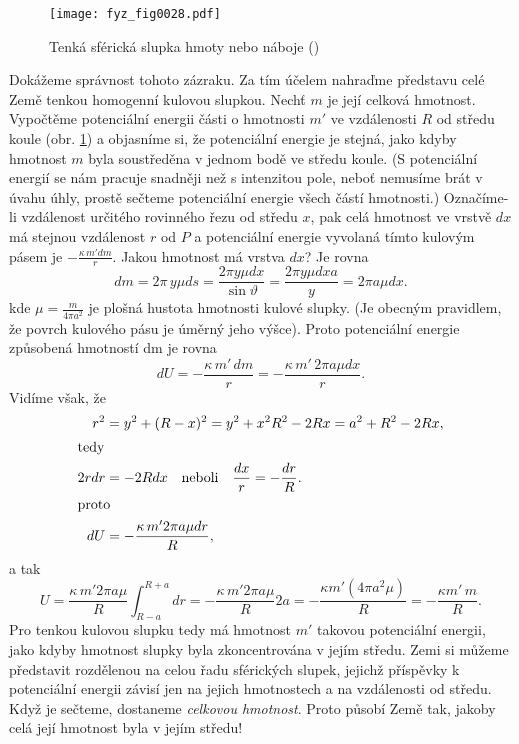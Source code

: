     \begin{figure}[ht!]  %
      \centering
      \texttt{[image: fyz\_fig0028.pdf]}
      \caption{Tenká sférická slupka hmoty nebo náboje (\cite[s.~195]{Feynman01})}
      \label{fyz:fig0028}
    \end{figure}
    Dokážeme správnost tohoto zázraku. Za tím účelem nahraďme představu celé Země tenkou homogenní 
    kulovou slupkou. Nechť \(m\) je její celková hmotnost. Vypočtěme potenciální energii části o 
    hmotnosti \(m'\) ve vzdálenosti \(R\) od středu koule (obr. \ref{fyz:fig0028}) a objasníme si, 
    že potenciální energie je stejná, jako kdyby hmotnost \(m\) byla soustředěna v jednom bodě ve 
    středu koule. (S potenciální energií se nám pracuje snadněji než s intenzitou pole, neboť 
    nemusíme brát v úvahu úhly, prostě sečteme potenciální energie všech částí hmotnosti.) 
    Označíme-li vzdálenost určitého rovinného řezu od středu \(x\), pak celá hmotnost ve vrstvě 
    \(dx\) má stejnou vzdálenost \(r\) od \(P\) a potenciální energie vyvolaná tímto kulovým pásem 
    je \(-\frac{\kappa\,m'dm}{r}\). Jakou hmotnost má vrstva \(dx\)? Je rovna
    \begin{equation}\label{fyz:eq049}
      dm = 2\pi\,y\mu ds = \frac{2\pi y\mu dx}{\sin\vartheta} 
         = \frac{2\pi y\mu dxa}{y} = 2\pi a\mu dx.
    \end{equation}
    kde \(\mu = \frac{m}{4\pi a^2}\) je plošná hustota hmotnosti kulové slupky. (Je obecným 
    pravidlem, že povrch kulového pásu je úměrný jeho výšce). Proto potenciální energie způsobená 
    hmotností dm je rovna
    \begin{equation}\label{fyz:eq050}
      dU = -\frac{\kappa\,m'\,dm}{r} = -\frac{\kappa\,m'\,2\pi a\mu dx}{r}.
    \end{equation}
    Vidíme však, že
    \begin{align*}
      r^2  &= y^2 + (R-x)^2 = y^2 + x^2 R^2 - 2Rx = a^2 + R^2 - 2Rx,           \\
      \shortintertext{tedy}
      2rdr &= -2Rdx \quad \text{neboli} \quad \frac{dx}{r} = - \frac{dr}{R}. \\
      \shortintertext{proto}
      dU   &= - \frac{\kappa\,m'2\pi a\mu dr}{R},
    \end{align*}
    a tak
    \begin{equation}
      U  =   \frac{\kappa\,m'2\pi a\mu}{R}\int_{R-a}^{R+a}dr              
         = - \frac{\kappa\,m'2\pi a\mu}{R}2a                                
         = - \frac{\kappa m'(4\pi a^2\mu)}{R} = -\frac{\kappa m'\,m}{R}.    \label{fyz:eq051}
    \end{equation}    
    Pro tenkou kulovou slupku tedy má hmotnost \(m'\) takovou potenciální energii, jako kdyby 
    hmotnost slupky byla zkoncentrována v jejím středu. Zemi si můžeme představit rozdělenou na 
    celou řadu sférických slupek, jejichž příspěvky k potenciální energii závisí jen na jejich 
    hmotnostech a na vzdálenosti od středu. Když je sečteme, dostaneme \emph{celkovou hmotnost}. 
    Proto působí Země tak, jakoby celá její hmotnost byla v jejím středu!
    
